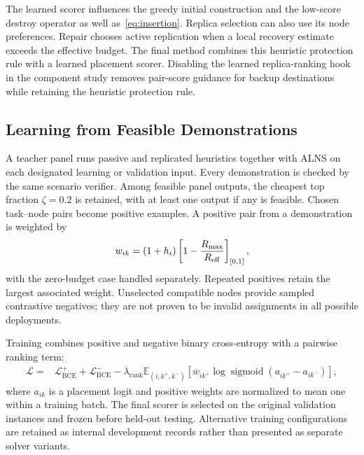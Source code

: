 The learned scorer influences the greedy initial construction and the
low-score destroy operator as well as~\eqref{eq:insertion}. Replica selection
can also use its node preferences. Repair chooses active replication when a
local recovery estimate exceeds the effective budget. The final method
combines this heuristic protection rule with a learned placement scorer.
Disabling the learned
replica-ranking hook in the component study removes pair-score guidance for
backup destinations while retaining the heuristic protection rule.

\subsection{Learning from Feasible Demonstrations}
A teacher panel runs passive and replicated heuristics together with ALNS on
each designated learning or validation input. Every demonstration is checked
by the same scenario verifier. Among feasible panel outputs, the cheapest
top fraction $\zeta=0.2$ is retained, with at least one output if any is
feasible. Chosen task--node pairs become positive examples. A positive pair
from a demonstration is weighted by
\begin{equation}
 w_{ik}=(1+h_i)\left[1-\frac{R_{\max}}{R_{\mathrm{eff}}}\right]_{[0,1]},
 \label{eq:teacher_weight}
\end{equation}
with the zero-budget case handled separately. Repeated positives retain the
largest associated weight. Unselected compatible nodes provide sampled
contrastive negatives; they are not proven to be invalid assignments in all
possible deployments.

Training combines positive and negative binary cross-entropy with a pairwise
ranking term:
\begin{equation}
\begin{split}
 \mathcal L={}&\mathcal L_{\mathrm{BCE}}^{+}
 +\mathcal L_{\mathrm{BCE}}^{-}
 -\lambda_{\mathrm{rank}}
   \mathbb E_{(i,k^+,k^-)}
   [\overline w_{ik^+}\log\operatorname{sigmoid}(a_{ik^+}-a_{ik^-})],
\end{split}
\label{eq:training_loss}
\end{equation}
where $a_{ik}$ is a placement logit and positive weights are normalized to
mean one within a training batch. The final scorer is selected on the original
validation instances and frozen before held-out testing. Alternative training
configurations are retained as internal development records rather than
presented as separate solver variants.

